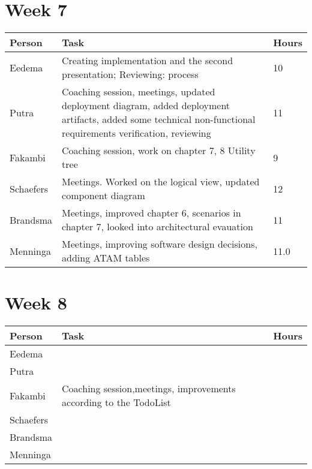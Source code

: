 \section{Week 7}
\begin{tabular}{p{} p{} p{}}
	\textbf{Person} & \textbf{Task}                                                                                                                  & \textbf{Hours} \\ \midrule
	Eedema          & Creating implementation and the second presentation; Reviewing: process& 10 \\ \midrule
	Putra           & Coaching session, meetings, updated deployment diagram, added deployment artifacts, added some technical non-functional requirements verification, reviewing & 11 \\ \midrule
	Fakambi         & Coaching session, work on chapter 7, 8 Utility tree & 9\\ \midrule
	Schaefers       & Meetings. Worked on the logical view, updated component diagram & 12 \\ \midrule
	Brandsma        & Meetings, improved chapter 6, scenarios in chapter 7, looked into architectural evauation & 11 \\ \midrule
	Menninga        & Meetings, improving software design decisions, adding ATAM tables                      &  11.0    \\
	\midrule
\end{tabular}

\section{Week 8}
\begin{tabular}{p{} p{} p{}}
	\textbf{Person} & \textbf{Task}                                                                                                                  & \textbf{Hours} \\ \midrule
	Eedema          & & \\ \midrule
	Putra           & &  \\ \midrule
	Fakambi         & Coaching session,meetings, improvements according to the TodoList  & \\ \midrule
	Schaefers       & & \\ \midrule
	Brandsma        & & \\ \midrule
	Menninga        &  &  \\
	\midrule
\end{tabular}